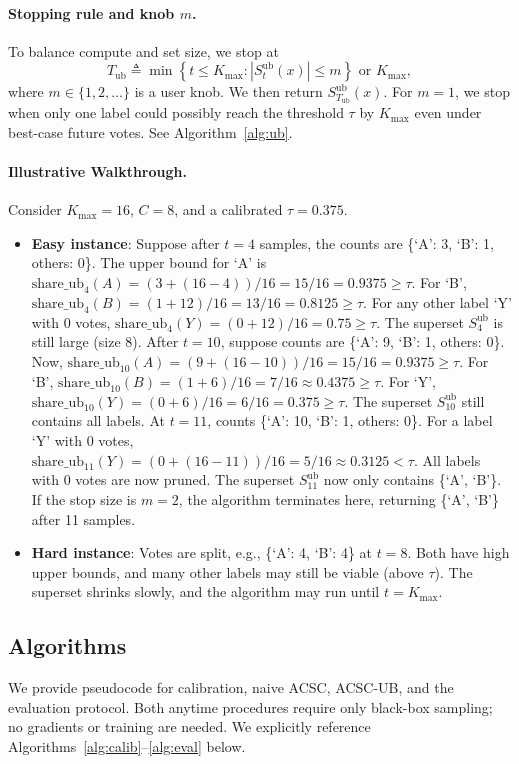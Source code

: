 \documentclass[11pt]{article}
\begin{document}
\paragraph{Stopping rule and knob $m$.}
To balance compute and set size, we stop at
\[
T_{\text{ub}} \triangleq \min\left\{t \le K_{\max}: |S_t^{\text{ub}}(x)| \le m \right\} \text{ or } K_{\max},
\]
where $m \in \{1,2,\dots\}$ is a user knob. We then return $S^{\text{ub}}_{T_{\text{ub}}}(x)$. For $m=1$, we stop when only one label could possibly reach the threshold $\tau$ by $K_{\max}$ even under best-case future votes. See Algorithm~\ref{alg:ub}.

\paragraph{Illustrative Walkthrough.} Consider $K_{\max}=16$, $C=8$, and a calibrated $\tau=0.375$.
\begin{itemize}
    \item \textbf{Easy instance}: Suppose after $t=4$ samples, the counts are \{`A': 3, `B': 1, others: 0\}.
    The upper bound for `A' is $\text{share\_ub}_4(A) = (3 + (16-4))/16 = 15/16 = 0.9375 \ge \tau$.
    For `B', $\text{share\_ub}_4(B) = (1 + 12)/16 = 13/16 = 0.8125 \ge \tau$.
    For any other label `Y' with 0 votes, $\text{share\_ub}_4(Y) = (0+12)/16 = 0.75 \ge \tau$. The superset $S^{\text{ub}}_4$ is still large (size 8).
    After $t=10$, suppose counts are \{`A': 9, `B': 1, others: 0\}.
    Now, $\text{share\_ub}_{10}(A) = (9 + (16-10))/16 = 15/16 = 0.9375 \ge \tau$.
    For `B', $\text{share\_ub}_{10}(B) = (1+6)/16 = 7/16 \approx 0.4375 \ge \tau$.
    For `Y', $\text{share\_ub}_{10}(Y)=(0+6)/16 = 6/16 = 0.375 \ge \tau$. The superset $S^{\text{ub}}_{10}$ still contains all labels.
    At $t=11$, counts \{`A': 10, `B': 1, others: 0\}.
    For a label `Y' with 0 votes, $\text{share\_ub}_{11}(Y)=(0 + (16-11))/16 = 5/16 \approx 0.3125 < \tau$. All labels with 0 votes are now pruned. The superset $S^{\text{ub}}_{11}$ now only contains \{`A', `B'\}. If the stop size is $m=2$, the algorithm terminates here, returning \{`A', `B'\} after 11 samples.
    \item \textbf{Hard instance}: Votes are split, e.g., \{`A': 4, `B': 4\} at $t=8$. Both have high upper bounds, and many other labels may still be viable (above $\tau$). The superset shrinks slowly, and the algorithm may run until $t=K_{\max}$.
\end{itemize}

\subsection{Algorithms}
We provide pseudocode for calibration, naive ACSC, ACSC-UB, and the evaluation protocol. Both anytime procedures require only black-box sampling; no gradients or training are needed. We explicitly reference Algorithms~\ref{alg:calib}--\ref{alg:eval} below.
\end{document}
